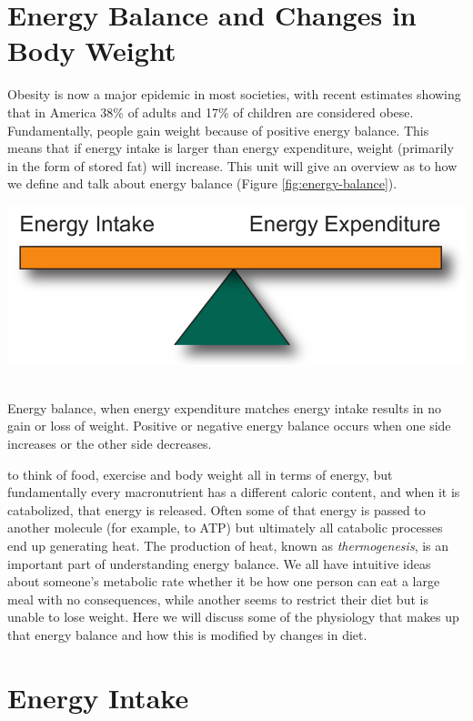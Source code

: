 \documentclass{tufte-handout}
\begin{document}
\section{Energy Balance and Changes in Body Weight}

Obesity is now a major epidemic in most societies, with recent estimates showing that in America 38\% of adults and 17\% of children are considered obese\citep{Flegal2016,Ogden2016}.  Fundamentally, people gain weight because of positive energy balance.  This means that if energy intake is larger than energy expenditure, weight (primarily in the form of stored fat) will increase.  This unit will give an overview as to how we define and talk about energy balance (Figure \ref{fig:energy-balance}).

\begin{marginfigure}
\includegraphics{figures/Energy-Balance.pdf}\
\caption{Energy balance, when energy expenditure matches energy intake results in no gain or loss of weight.  Positive or negative energy balance occurs when one side increases or the other side decreases.}
\label{fig:energy-balance}
\end{marginfigure}

 to think of food, exercise and body weight all in terms of energy, but fundamentally every macronutrient has a different caloric content, and when it is catabolized, that energy is released.  Often some of that energy is passed to another molecule (for example, to ATP) but ultimately all catabolic processes end up generating heat.  The production of heat, known as \emph{thermogenesis}, is an important part of understanding energy balance.  We all have intuitive ideas about someone's metabolic rate whether it be how one person can eat a large meal with no consequences, while another seems to restrict their diet but is unable to lose weight.  Here we will discuss some of the physiology that makes up that energy balance and how this is modified by changes in diet.

\section{Energy Intake}
\end{document}
